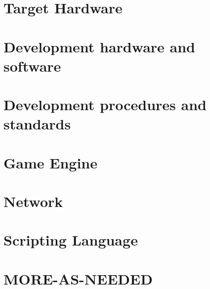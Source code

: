\section{Target Hardware}
\section{Development hardware and software}
\section{Development procedures and standards}
\section{Game Engine}
\section{Network}
\section{Scripting Language}
\section{MORE-AS-NEEDED}
